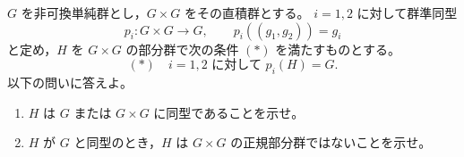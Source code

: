 \documentclass[12pt]{jlreq}
\begin{document}
\(G\) を非可換単純群とし，\(G\times G\) をその直積群とする。
\(i=1,2\) に対して群準同型
\[
  p_i:G\times G\longrightarrow G,\qquad
  p_i((g_1,g_2))=g_i
\]
と定め，\(H\) を \(G\times G\) の部分群で次の条件 \((*)\) を満たすものとする。
\[
  (*)\quad i=1,2\text{ に対して }p_i(H)=G.
\]
以下の問いに答えよ。

\begin{enumerate}
  \item \(H\) は \(G\) または \(G\times G\) に同型であることを示せ。
  \item \(H\) が \(G\) と同型のとき，\(H\) は \(G\times G\) の正規部分群ではないことを示せ。
\end{enumerate}
\end{document}
